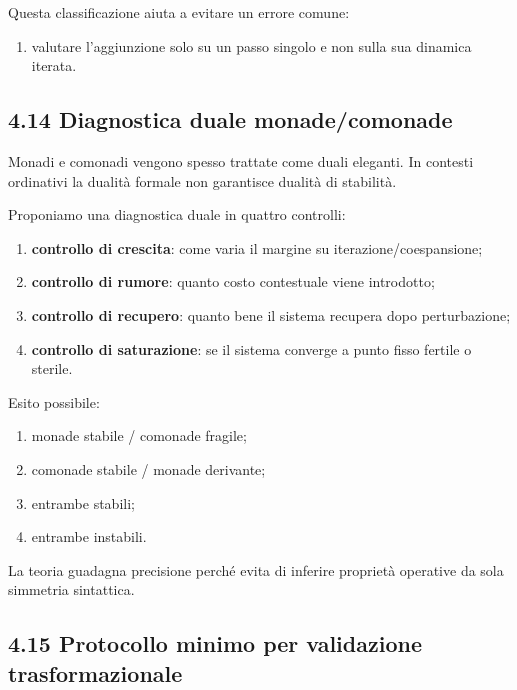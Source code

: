 Questa classificazione aiuta a evitare un errore comune:

\begin{enumerate}
\def\labelenumi{\arabic{enumi}.}
\tightlist
\item
  valutare l'aggiunzione solo su un passo singolo e non sulla sua dinamica iterata.
\end{enumerate}

\subsection{4.14 Diagnostica duale monade/comonade}

Monadi e comonadi vengono spesso trattate come duali eleganti. In contesti ordinativi la dualità formale non garantisce dualità di stabilità.

Proponiamo una diagnostica duale in quattro controlli:

\begin{enumerate}
\def\labelenumi{\arabic{enumi}.}
\tightlist
\item
  \textbf{controllo di crescita}: come varia il margine su iterazione/coespansione;
\item
  \textbf{controllo di rumore}: quanto costo contestuale viene introdotto;
\item
  \textbf{controllo di recupero}: quanto bene il sistema recupera dopo perturbazione;
\item
  \textbf{controllo di saturazione}: se il sistema converge a punto fisso fertile o sterile.
\end{enumerate}

Esito possibile:

\begin{enumerate}
\def\labelenumi{\arabic{enumi}.}
\tightlist
\item
  monade stabile / comonade fragile;
\item
  comonade stabile / monade derivante;
\item
  entrambe stabili;
\item
  entrambe instabili.
\end{enumerate}

La teoria guadagna precisione perché evita di inferire proprietà operative da sola simmetria sintattica.

\subsection{4.15 Protocollo minimo per validazione trasformazionale}

